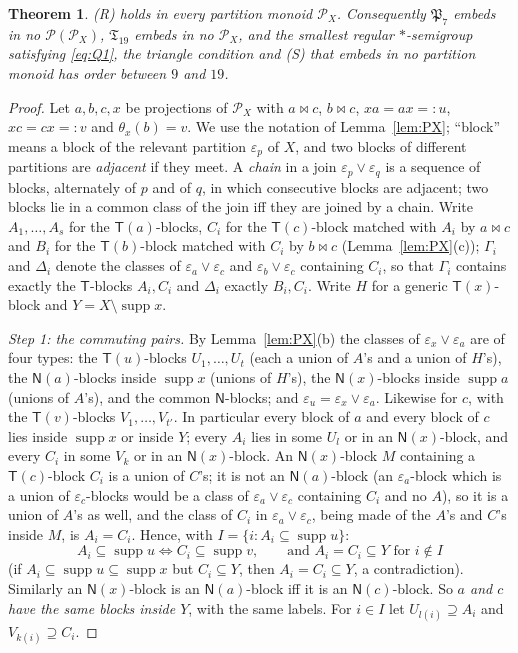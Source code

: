 \documentclass[11pt]{amsart}
\newtheorem{theorem}{Theorem}[section]
\theoremstyle{definition}
\renewcommand{\P}{\mathcal{P}}
\newcommand{\supp}{\operatorname{supp}}
\newcommand{\T}{\mathsf{T}}
\newcommand{\N}{\mathsf{N}}
\newcommand{\mt}{\bowtie}   %
\begin{document}
\begin{theorem}\label{thm:R}
(R) holds in every partition monoid $\P_X$. Consequently $\mathfrak P_7$ embeds in no $\P(\P_X)$, $\mathfrak T_{19}$ embeds in no $\P_X$, and the smallest regular $*$-semigroup satisfying \eqref{eq:Q1}, the triangle condition and (S) that embeds in no partition monoid has order between $9$ and $19$.
\end{theorem}

\begin{proof}
Let $a,b,c,x$ be projections of $\P_X$ with $a\mt c$, $b\mt c$, $xa=ax=:u$, $xc=cx=:v$ and $\theta_x(b)=v$. We use the notation of Lemma~\ref{lem:PX}; ``block'' means a block of the relevant partition $\varepsilon_p$ of $X$, and two blocks of different partitions are \emph{adjacent} if they meet. A \emph{chain} in a join $\varepsilon_p\vee\varepsilon_q$ is a sequence of blocks, alternately of $p$ and of $q$, in which consecutive blocks are adjacent; two blocks lie in a common class of the join iff they are joined by a chain. Write $A_1,\dots,A_s$ for the $\T(a)$-blocks, $C_i$ for the $\T(c)$-block matched with $A_i$ by $a\mt c$ and $B_i$ for the $\T(b)$-block matched with $C_i$ by $b\mt c$ (Lemma~\ref{lem:PX}(c)); $\Gamma_i$ and $\Delta_i$ denote the classes of $\varepsilon_a\vee\varepsilon_c$ and $\varepsilon_b\vee\varepsilon_c$ containing $C_i$, so that $\Gamma_i$ contains exactly the $\T$-blocks $A_i,C_i$ and $\Delta_i$ exactly $B_i,C_i$. Write $H$ for a generic $\T(x)$-block and $Y=X\setminus\supp x$.

\smallskip
\emph{Step 1: the commuting pairs.} By Lemma~\ref{lem:PX}(b) the classes of $\varepsilon_x\vee\varepsilon_a$ are of four types: the $\T(u)$-blocks $U_1,\dots,U_t$ (each a union of $A$'s and a union of $H$'s), the $\N(a)$-blocks inside $\supp x$ (unions of $H$'s), the $\N(x)$-blocks inside $\supp a$ (unions of $A$'s), and the common $\N$-blocks; and $\varepsilon_u=\varepsilon_x\vee\varepsilon_a$. Likewise for $c$, with the $\T(v)$-blocks $V_1,\dots,V_{t'}$. In particular every block of $a$ and every block of $c$ lies inside $\supp x$ or inside $Y$; every $A_i$ lies in some $U_l$ or in an $\N(x)$-block, and every $C_i$ in some $V_k$ or in an $\N(x)$-block. An $\N(x)$-block $M$ containing a $\T(c)$-block $C_i$ is a union of $C$'s; it is not an $\N(a)$-block (an $\varepsilon_a$-block which is a union of $\varepsilon_c$-blocks would be a class of $\varepsilon_a\vee\varepsilon_c$ containing $C_i$ and no $A$), so it is a union of $A$'s as well, and the class of $C_i$ in $\varepsilon_a\vee\varepsilon_c$, being made of the $A$'s and $C$'s inside $M$, is $A_i=C_i$. Hence, with $I=\{i:A_i\subseteq\supp u\}$:
\[
A_i\subseteq\supp u\iff C_i\subseteq\supp v,\qquad\text{and } A_i=C_i\subseteq Y\text{ for } i\notin I
\]
(if $A_i\subseteq\supp u\subseteq\supp x$ but $C_i\subseteq Y$, then $A_i=C_i\subseteq Y$, a contradiction). Similarly an $\N(x)$-block is an $\N(a)$-block iff it is an $\N(c)$-block. So \emph{$a$ and $c$ have the same blocks inside $Y$}, with the same labels. For $i\in I$ let $U_{l(i)}\supseteq A_i$ and $V_{k(i)}\supseteq C_i$.


\end{proof}
\end{document}
